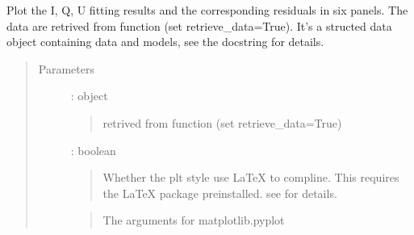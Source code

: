 \documentclass[letterpaper,10pt,english]{sphinxmanual}
\begin{document}
\begin{fulllineitems}
\begin{fulllineitems}
\end{fulllineitems}


\begin{fulllineitems}
\label{\detokenize{APIdocs/xspecanalysis:ixpetools.xspeclib.io.XspecSpec.plot_stokes_spectra}}
\sphinxAtStartPar
Plot the I, Q, U fitting results and the corresponding residuals in six panels.
The data are retrived from function {\hyperref[\detokenize{APIdocs/xspecanalysis:ixpetools.xspeclib.io.XspecSpec.plot}]{}} (set retrieve\_data=True).
It’s a structed data object containing data and models, see the docstring for details.
\begin{quote}\begin{description}
\item[{Parameters}] \leavevmode
\sphinxAtStartPar
{} : object
\begin{quote}

\sphinxAtStartPar
retrived from function {\hyperref[\detokenize{APIdocs/xspecanalysis:ixpetools.xspeclib.io.XspecSpec.plot}]{}} (set retrieve\_data=True)
\end{quote}

\sphinxAtStartPar
{} : boolean
\begin{quote}

\sphinxAtStartPar
Whether the plt style use LaTeX to compline. This requires the LaTeX package
pre\sphinxhyphen{}installed. see  for details.
\end{quote}

\sphinxAtStartPar
{}
\begin{quote}

\sphinxAtStartPar
The arguments for matplotlib.pyplot
\end{quote}

\end{description}\end{quote}


\end{fulllineitems}
\end{fulllineitems}
\end{document}
